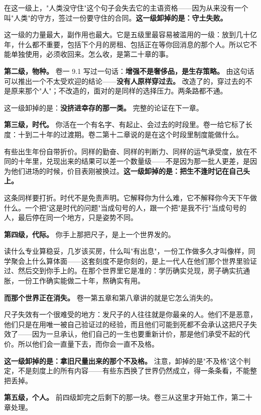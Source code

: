 \documentclass[11pt,a4paper]{ctexart}
\begin{document}
在这一级上，"人类没守住"这个句子会失去它的主语资格——因为从来没有一个叫"人类"的守方，签过一份要守住的合同。\textbf{这一级卸掉的是：守土失败。}

这一级的力量最大，副作用也最大。它是五级里最容易被滥用的一级：放到几十亿年，什么都不重要，包括下个月的房租、包括正在等你回消息的那个人。所以它不能单独使用，必须收回来。怎么收，是第二十章的事。

\textbf{第二级，物种。} 卷一 9.1 写过一句话：\textbf{增强不是奢侈品，是生存策略。} 由这句话可以推出一个不太受欢迎的结论——\textbf{没有人原样穿过去。} 改造了的，穿过去的不是原来那个"人"；不改造的，面对的是同样的选择压力。两条路都不通。

这一级卸掉的是：\textbf{没挤进幸存的那一类。} 完整的论证在下一章。

\textbf{第三级，时代。} 你活在一个有名字、有起止、会过去的时段里。卷一给它标了长度：十到二十年的过渡期。卷二第十二章说的是在这个时段里制度能做什么。

有些出生年份自带折价。同样的勤奋、同样的判断力、同样的运气承受度，放在不同的十年里，兑现出来的结果可以差一个数量级——不是因为那一批人更差，是因为他们进场的时候，价目表刚被换过。\textbf{这一级卸掉的是：把生不逢时记在自己头上。}

这条同样要打折。时代不是免责声明。它解释你为什么难，它不解释你今天下午做什么。一个把"这是时代的问题"当成句号的人，跟一个把"是我不行"当成句号的人，最后停在同一个地方，只是姿势不同。

\textbf{第四级，代际。} 你手上那把尺子，是上一个世界发的。

读什么专业算稳妥，几岁该买房，什么叫"有出息"，一份工作做多久才叫像样，同学聚会上什么算体面——这套刻度不是你刻的，是上一代人在他们那个世界里验证过、然后交到你手上的。在那个世界里它是准的：学历确实兑现，房子确实抗通胀，一份工作确实能做二十年，熬确实有用。

\textbf{而那个世界正在消失。} 卷一第五章和第八章讲的就是它怎么消失的。

尺子失效有一个很难受的地方：发尺子的人往往就是你最亲的人。他们不是恶意，他们只是在用唯一被自己验证过的经验，而且他们可能到死都不会承认这把尺子失效了——因为一旦承认，他们自己的一生也要重新计价，那是他们承受不起的代价。所以他们会一直量下去，而你会一直不及格。

\textbf{这一级卸掉的是：拿旧尺量出来的那个不及格。} 注意，卸掉的是"不及格"这个判定，不是刻度上的所有内容——有些东西换了世界仍然成立，得一条条看，不能整把丢掉。

\textbf{第五级，个人。} 前四级卸完之后剩下的那一块。卷三从这里才开始工作，第二十章处理。
\end{document}

